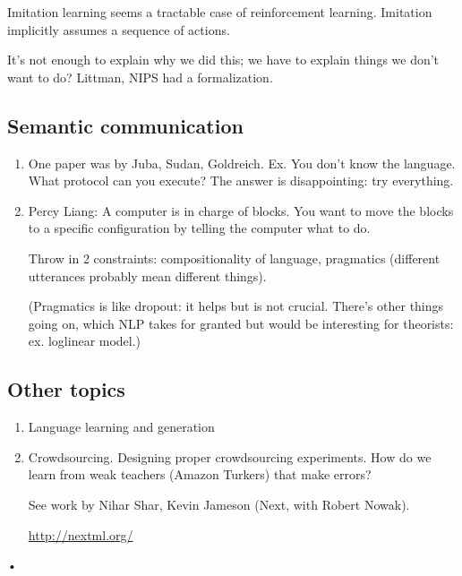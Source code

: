 Imitation learning seems a tractable case of reinforcement learning.
Imitation implicitly assumes a sequence of actions.


It's not enough to explain why we did this; we have to explain things we don't want to do?
Littman, NIPS had a formalization.

\subsection{Semantic communication}

\begin{enumerate}
\item
One paper was by Juba, Sudan, Goldreich.
Ex. You don't know the language. What protocol can you execute? The answer is disappointing: try everything.
\item
Percy Liang: A computer is in charge of blocks. You want to move the blocks to a specific configuration by telling the computer what to do.

Throw in 2 constraints: compositionality of language, pragmatics (different utterances probably mean different things).

(Pragmatics is like dropout: it helps but is not crucial. There's other things going on, which NLP takes for granted but would be interesting for theorists: ex. loglinear model.)
\end{enumerate}

\subsection{Other topics}

\begin{enumerate}
\item
Language learning and generation
\item
Crowdsourcing. Designing proper crowdsourcing experiments.
How do we learn from weak teachers (Amazon Turkers) that make errors?

See work by Nihar Shar, Kevin Jameson (Next, with Robert Nowak).

\url{http://nextml.org/} 
\end{enumerate}•


